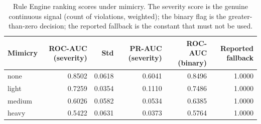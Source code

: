 \begin{table}[t]
\centering
\caption{Rule Engine ranking scores under mimicry. The severity score is the genuine continuous signal (count of violations, weighted); the binary flag is the greater-than-zero decision; the reported fallback is the constant that must not be used.}
\label{tab:rerec}
{\small
\begin{tabular}{lrrrrr}
\toprule
Mimicry & ROC-AUC (severity) & Std & PR-AUC (severity) & ROC-AUC (binary) & Reported fallback \\
\midrule
none & 0.8502 & 0.0618 & 0.6041 & 0.8496 & 1.0000 \\
light & 0.7259 & 0.0354 & 0.1110 & 0.7486 & 1.0000 \\
medium & 0.6026 & 0.0582 & 0.0534 & 0.6385 & 1.0000 \\
heavy & 0.5422 & 0.0631 & 0.0373 & 0.5764 & 1.0000 \\
\bottomrule
\end{tabular}
}
\end{table}
